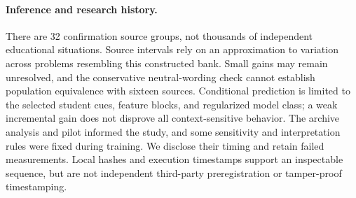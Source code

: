 \paragraph{Inference and research history.}
There are 32 confirmation source groups, not thousands of
independent educational situations. Source intervals rely on an approximation
to variation across problems resembling this constructed bank. Small gains may
remain unresolved, and the conservative neutral-wording check cannot establish
population equivalence with sixteen sources. Conditional
prediction is limited to the selected student cues, feature blocks, and
regularized model class; a weak incremental gain does not disprove all
context-sensitive behavior. The archive analysis and pilot informed the study,
and some sensitivity and interpretation rules were fixed during training.
We disclose their timing and retain failed measurements. Local hashes and
execution timestamps support an inspectable sequence, but are not independent
third-party preregistration or tamper-proof timestamping.
